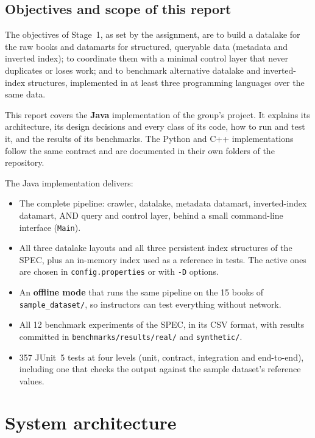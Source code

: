 \documentclass[11pt,a4paper]{article}
\newcommand{\code}[1]{\texttt{#1}}
\begin{document}
\subsection{Objectives and scope of this report}
The objectives of Stage~1, as set by the assignment, are to build a datalake for the raw books and
datamarts for structured, queryable data (metadata and inverted index); to coordinate them with a
minimal control layer that never duplicates or loses work; and to benchmark alternative datalake and
inverted-index structures, implemented in at least three programming languages over the same data.

This report covers the \textbf{Java} implementation of the group's project. It explains its
architecture, its design decisions and every class of its code, how to run and test it, and the
results of its benchmarks. The Python and C++ implementations follow the same contract and are
documented in their own folders of the repository.

The Java implementation delivers:
\begin{itemize}
  \item The complete pipeline: crawler, datalake, metadata datamart, inverted-index datamart, AND
        query and control layer, behind a small command-line interface (\code{Main}).
  \item All three datalake layouts and all three persistent index structures of the SPEC, plus an
        in-memory index used as a reference in tests. The active ones are chosen in
        \code{config.properties} or with \code{-D} options.
  \item An \textbf{offline mode} that runs the same pipeline on the 15 books of
        \code{sample\_dataset/}, so instructors can test everything without network.
  \item All 12 benchmark experiments of the SPEC, in its CSV format, with results committed in
        \code{benchmarks/results/real/} and \code{synthetic/}.
  \item 357 JUnit~5 tests at four levels (unit, contract, integration and end-to-end), including one
        that checks the output against the sample dataset's reference values.
\end{itemize}

\section{System architecture}
\end{document}
